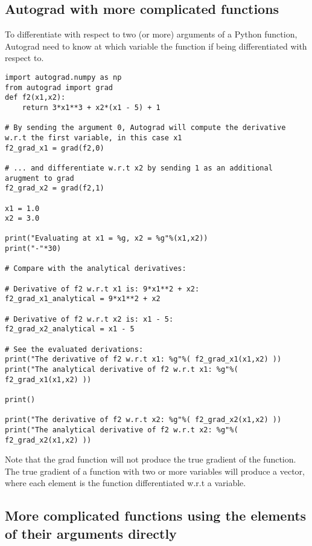 \documentclass[%
oneside,                 %
final,                   %
10pt]{article}
\begin{document}
\subsection*{Autograd with more complicated functions}

To differentiate with respect to two (or more) arguments of a Python
function, Autograd need to know at which variable the function if
being differentiated with respect to.

\begin{verbatim}
import autograd.numpy as np
from autograd import grad
def f2(x1,x2):
    return 3*x1**3 + x2*(x1 - 5) + 1

# By sending the argument 0, Autograd will compute the derivative w.r.t the first variable, in this case x1
f2_grad_x1 = grad(f2,0)

# ... and differentiate w.r.t x2 by sending 1 as an additional arugment to grad
f2_grad_x2 = grad(f2,1)

x1 = 1.0
x2 = 3.0 

print("Evaluating at x1 = %g, x2 = %g"%(x1,x2))
print("-"*30)

# Compare with the analytical derivatives:

# Derivative of f2 w.r.t x1 is: 9*x1**2 + x2:
f2_grad_x1_analytical = 9*x1**2 + x2

# Derivative of f2 w.r.t x2 is: x1 - 5:
f2_grad_x2_analytical = x1 - 5

# See the evaluated derivations:
print("The derivative of f2 w.r.t x1: %g"%( f2_grad_x1(x1,x2) ))
print("The analytical derivative of f2 w.r.t x1: %g"%( f2_grad_x1(x1,x2) ))

print()

print("The derivative of f2 w.r.t x2: %g"%( f2_grad_x2(x1,x2) ))
print("The analytical derivative of f2 w.r.t x2: %g"%( f2_grad_x2(x1,x2) ))
\end{verbatim}

Note that the grad function will not produce the true gradient of the function. The true gradient of a function with two or more variables will produce a vector, where each element is the function differentiated w.r.t a variable.


\subsection*{More complicated functions using the elements of their arguments directly}
\end{document}
